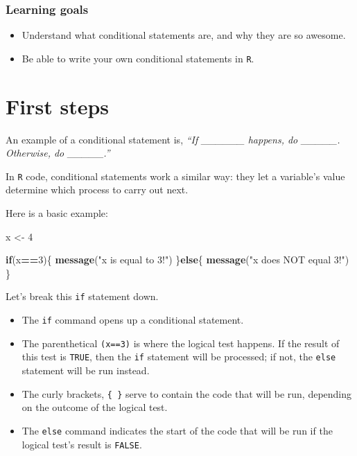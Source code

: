 \documentclass[
]{book}
\newenvironment{Shaded}{\begin{snugshade}}{\end{snugshade}}
\newcommand{\ControlFlowTok}[1]{\textcolor[rgb]{0.13,0.29,0.53}{\textbf{#1}}}
\newcommand{\DecValTok}[1]{\textcolor[rgb]{0.00,0.00,0.81}{#1}}
\newcommand{\KeywordTok}[1]{\textcolor[rgb]{0.13,0.29,0.53}{\textbf{#1}}}
\newcommand{\NormalTok}[1]{#1}
\newcommand{\OperatorTok}[1]{\textcolor[rgb]{0.81,0.36,0.00}{\textbf{#1}}}
\newcommand{\StringTok}[1]{\textcolor[rgb]{0.31,0.60,0.02}{#1}}
\providecommand{\tightlist}{%
  \setlength{\itemsep}{0pt}\setlength{\parskip}{0pt}}
\begin{document}
\hypertarget{learning-goals-16}{%
\subsubsection*{Learning goals}\label{learning-goals-16}}

\begin{itemize}
\tightlist
\item
  Understand what conditional statements are, and why they are so awesome.
\item
  Be able to write your own conditional statements in \texttt{R}.
\end{itemize}

\hypertarget{first-steps-1}{%
\section*{First steps}\label{first-steps-1}}

An example of a conditional statement is, \emph{``If \_\_\_\_\_\_ happens, do \_\_\_\_\_. Otherwise, do \_\_\_\_\_.''}

In \texttt{R} code, conditional statements work a similar way: they let a variable's value determine which process to carry out next.

Here is a basic example:

\begin{Shaded}
\begin{Highlighting}[]
\NormalTok{x <-}\StringTok{ }\DecValTok{4}

\ControlFlowTok{if}\NormalTok{(x}\OperatorTok{==}\DecValTok{3}\NormalTok{)\{}
  \KeywordTok{message}\NormalTok{(}\StringTok{"x is equal to 3!"}\NormalTok{)}
\NormalTok{\}}\ControlFlowTok{else}\NormalTok{\{}
  \KeywordTok{message}\NormalTok{(}\StringTok{"x does NOT equal 3!"}\NormalTok{)}
\NormalTok{\}}
\end{Highlighting}
\end{Shaded}

Let's break this \texttt{if} statement down.

\begin{itemize}
\tightlist
\item
  The \texttt{if} command opens up a conditional statement.
\item
  The parenthetical \texttt{(x==3)} is where the logical test happens. If the result of this test is \texttt{TRUE}, then the \texttt{if} statement will be processed; if not, the \texttt{else} statement will be run instead.
\item
  The curly brackets, \texttt{\{\ \}} serve to contain the code that will be run, depending on the outcome of the logical test.
\item
  The \texttt{else} command indicates the start of the code that will be run if the logical test's result is \texttt{FALSE}.
\end{itemize}
\end{document}
